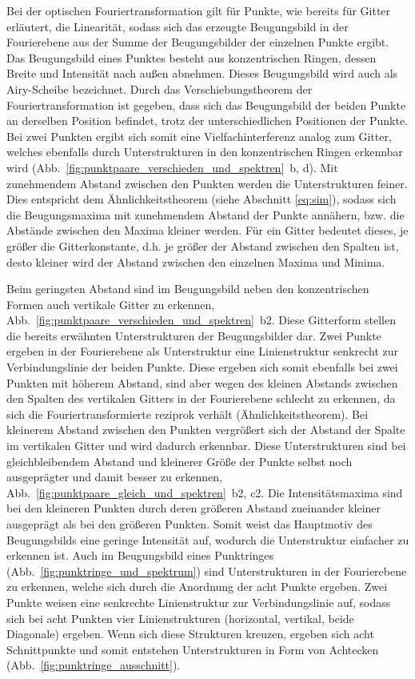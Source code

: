 Bei der optischen Fouriertransformation gilt für Punkte, wie bereits für Gitter erläutert, die Linearität, sodass sich das erzeugte Beugungsbild in der Fourierebene aus der Summe der Beugungsbilder der einzelnen Punkte ergibt. Das Beugungsbild eines Punktes besteht aus konzentrischen Ringen, dessen Breite und Intensität nach außen abnehmen. Dieses Beugungsbild wird auch als Airy-Scheibe bezeichnet. Durch das Verschiebungstheorem der Fouriertransformation ist gegeben, dass sich das Beugungsbild der beiden Punkte an derselben Position befindet, trotz der unterschiedlichen Positionen der Punkte. Bei zwei Punkten ergibt sich somit eine Vielfachinterferenz analog zum Gitter, welches ebenfalls durch Unterstrukturen in den konzentrischen Ringen erkennbar wird (Abb.~\ref{fig:punktpaare_verschieden_und_spektren}~b, d). Mit zunehmendem Abstand zwischen den Punkten werden die Unterstrukturen feiner. Dies entspricht dem Ähnlichkeitstheorem (siehe Abschnitt \ref{eq:sim}), sodass sich die Beugungsmaxima mit zunehmendem Abstand der Punkte annähern, bzw. die Abstände zwischen den Maxima kleiner werden. Für ein Gitter bedeutet dieses, je größer die Gitterkonstante, d.h. je größer der Abstand zwischen den Spalten ist, desto kleiner wird der Abstand zwischen den einzelnen Maxima und Minima.

Beim geringsten Abstand sind im Beugungsbild neben den konzentrischen Formen auch vertikale Gitter zu erkennen, Abb.~\ref{fig:punktpaare_verschieden_und_spektren}~b2. Diese Gitterform stellen die bereits erwähnten Unterstrukturen der Beugungsbilder dar. Zwei Punkte ergeben in der Fourierebene als
Unterstruktur eine Linienstruktur senkrecht zur Verbindungslinie der beiden Punkte. Diese ergeben sich somit ebenfalls bei zwei Punkten mit höherem Abstand, sind aber wegen des kleinen Abstands zwischen den Spalten des vertikalen Gitters in der Fourierebene schlecht zu erkennen, da sich die Fouriertransformierte reziprok verhält (Ähnlichkeitstheorem). Bei kleinerem Abstand zwischen den Punkten vergrößert sich der Abstand der Spalte im vertikalen Gitter und wird dadurch erkennbar. Diese Unterstrukturen sind bei gleichbleibendem Abstand und kleinerer Größe der Punkte selbst noch ausgeprägter und damit besser zu erkennen, Abb.~\ref{fig:punktpaare_gleich_und_spektren}~b2, c2. Die Intensitätsmaxima sind bei den kleineren Punkten durch deren größeren Abstand zueinander kleiner ausgeprägt als bei den größeren Punkten. Somit weist das Hauptmotiv des Beugungsbilds eine geringe Intensität auf, wodurch die Unterstruktur einfacher zu erkennen
ist.
Auch im Beugungsbild eines Punktringes (Abb.~\ref{fig:punktringe_und_spektrum}) sind Unterstrukturen in der Fourierebene zu erkennen, welche sich durch die Anordnung der acht Punkte ergeben. Zwei Punkte weisen eine senkrechte Linienstruktur zur Verbindungslinie auf, sodass sich bei acht Punkten vier Linienstrukturen (horizontal, vertikal, beide Diagonale) ergeben. Wenn sich diese Strukturen kreuzen, ergeben sich acht Schnittpunkte und somit entstehen Unterstrukturen in Form von Achtecken (Abb.~\ref{fig:punktringe_ausschnitt}).

